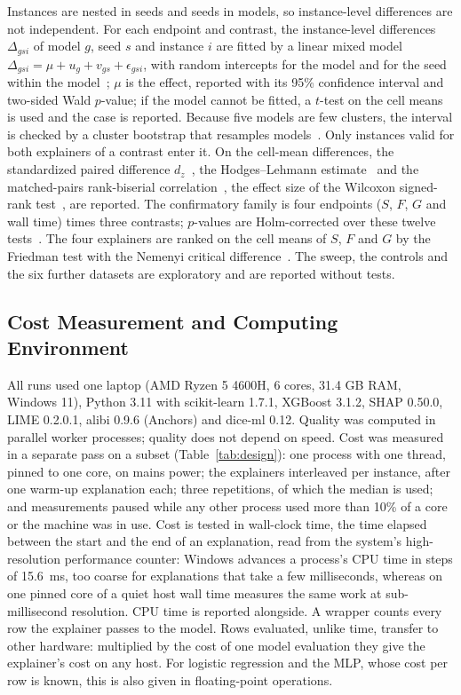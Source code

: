 \documentclass[11pt,a4paper]{article}
\begin{document}
Instances are nested in seeds and seeds in models, so instance-level
differences are not independent. For each endpoint and contrast, the
instance-level differences $\Delta_{gsi}$ of model $g$, seed $s$ and
instance $i$ are fitted by a linear mixed model
$\Delta_{gsi} = \mu + u_g + v_{gs} + \epsilon_{gsi}$, with random intercepts
for the model and for the seed within the model~\cite{bates2015lme4}; $\mu$
is the effect, reported with its 95\% confidence interval and two-sided
Wald $p$-value; if the model cannot be fitted, a $t$-test on the cell means
is used and the case is reported. Because five models are few clusters, the
interval is checked by a cluster bootstrap that resamples
models~\cite{field2007bootstrap}. Only instances valid for both explainers
of a contrast enter it. On the cell-mean differences, the standardized
paired difference $d_z$~\cite{lakens2013calculating}, the Hodges--Lehmann
estimate~\cite{hodges1963estimates} and the matched-pairs rank-biserial
correlation~\cite{kerby2014simple}, the effect size of the Wilcoxon
signed-rank test~\cite{wilcoxon1945individual}, are reported. The
confirmatory family is four endpoints ($S$, $F$, $G$ and wall time) times
three contrasts; $p$-values are Holm-corrected over these twelve
tests~\cite{holm1979simple}. The four explainers are ranked on the cell means
of $S$, $F$ and $G$ by the Friedman test with the Nemenyi critical
difference~\cite{demsar2006statistical}. The sweep, the controls and the six
further datasets are exploratory and are reported without tests.

\subsection{Cost Measurement and Computing Environment}
\label{sec:cost_method}

All runs used one laptop (AMD Ryzen 5 4600H, 6 cores, 31.4 GB RAM,
Windows 11), Python 3.11 with scikit-learn 1.7.1, XGBoost 3.1.2, SHAP
0.50.0, LIME 0.2.0.1, alibi 0.9.6 (Anchors) and dice-ml 0.12. Quality was
computed in parallel worker processes; quality does not depend on speed.
Cost was measured in a separate pass on a subset (Table~\ref{tab:design}):
one process with one thread, pinned to one core, on mains power; the
explainers interleaved per instance, after one warm-up explanation each;
three repetitions, of which the median is used; and measurements paused
while any other process used more than 10\% of a core or the machine was
in use. Cost is tested in wall-clock time, the time elapsed between the
start and the end of an explanation, read from the system's high-resolution
performance counter: Windows advances a process's CPU
time in steps of 15.6~ms, too coarse for explanations that take a few
milliseconds, whereas on one pinned core of a quiet host wall time measures
the same work at sub-millisecond resolution. CPU time is reported
alongside. A wrapper counts every row the explainer passes to the model.
Rows evaluated, unlike time, transfer to other hardware: multiplied by the
cost of one model evaluation they give the explainer's cost on any host.
For logistic regression and the MLP, whose cost per row is known, this is
also given in floating-point operations.
\end{document}
